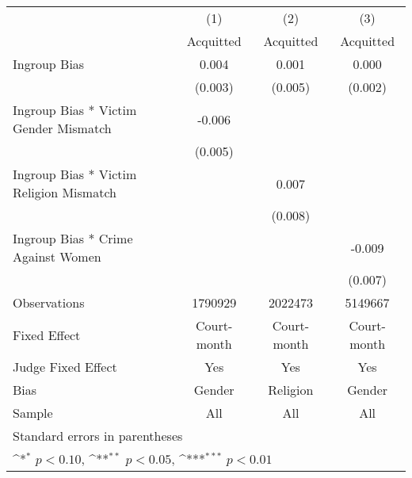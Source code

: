 {
\def\sym#1{\ifmmode^{#1}\else\(^{#1}\)\fi}
\begin{tabular}{l*{3}{c}}
\hline\hline
                    &\multicolumn{1}{c}{(1)}&\multicolumn{1}{c}{(2)}&\multicolumn{1}{c}{(3)}\\
                    &\multicolumn{1}{c}{Acquitted}&\multicolumn{1}{c}{Acquitted}&\multicolumn{1}{c}{Acquitted}\\
\hline
Ingroup Bias        &       0.004         &       0.001         &       0.000         \\
                    &     (0.003)         &     (0.005)         &     (0.002)         \\
[1em]
Ingroup Bias * Victim Gender Mismatch&      -0.006         &                     &                     \\
                    &     (0.005)         &                     &                     \\
[1em]
Ingroup Bias * Victim Religion Mismatch&                     &       0.007         &                     \\
                    &                     &     (0.008)         &                     \\
[1em]
Ingroup Bias * Crime Against Women&                     &                     &      -0.009         \\
                    &                     &                     &     (0.007)         \\
\hline
Observations        &     1790929         &     2022473         &     5149667         \\
Fixed Effect        & Court-month         & Court-month         & Court-month         \\
Judge Fixed Effect  &         Yes         &         Yes         &         Yes         \\
Bias                &      Gender         &    Religion         &      Gender         \\
Sample              &         All         &         All         &         All         \\
\hline\hline
\multicolumn{4}{l}{\footnotesize Standard errors in parentheses}\\
\multicolumn{4}{l}{\footnotesize \sym{*} \(p<0.10\), \sym{**} \(p<0.05\), \sym{***} \(p<0.01\)}\\
\end{tabular}
}
